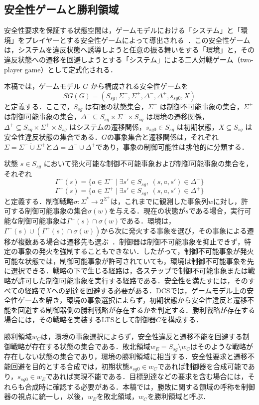 \subsection{安全性ゲームと勝利領域}
安全性要求を保証する状態空間は，ゲームモデルにおける「システム」と「環境」をプレイヤーとする安全性ゲームによって導出される~\cite{10.5555/938135}．この安全性ゲームは，システムを違反状態へ誘導しようと任意の振る舞いをする「環境」と，その違反状態への遷移を回避しようとする「システム」による二人対戦ゲーム（two-player game）として定式化される．

本稿では，ゲームモデル $G$ から構成される安全性ゲームを
\[
SG(G) = (S_{sg}, \Sigma^{-}, \Sigma^{+}, \Delta^{-}, \Delta^{+}, s_{sg0}, X)
\]
と定義する．ここで，$S_{sg}$ は有限の状態集合，$\Sigma^{-}$ は制御不可能事象の集合，$\Sigma^{+}$ は制御可能事象の集合，$\Delta^{-} \subseteq S_{sg} \times \Sigma^{-} \times S_{sg}$ は環境の遷移関係，$\Delta^{+} \subseteq S_{sg} \times \Sigma^{+} \times S_{sg}$ はシステムの遷移関係，$s_{sg0} \in S_{sg}$ は初期状態，$X \subseteq S_{sg}$ は安全性違反状態の集合である．$G$の事象集合と遷移関係は，それぞれ$\Sigma=\Sigma^{-}\mathbin{\dot\cup}\Sigma^{+}$と$\Delta=\Delta^{-}\cup\Delta^{+}$であり，事象の制御可能性は排他的に分類する．

状態 $s \in S_{sg}$ において発火可能な制御不可能事象および制御可能事象の集合を，それぞれ
\[
\Gamma^{-}(s) = \{ a \in \Sigma^{-} \mid \exists s' \in S_{sg},\ (s,a,s') \in \Delta^{-} \}
\]
\[
\Gamma^{+}(s) = \{ a \in \Sigma^{+} \mid \exists s' \in S_{sg},\ (s,a,s') \in \Delta^{+} \}
\]
と定義する．制御戦略$\sigma:\Sigma^*\to 2^{\Sigma^{+}}$は，これまでに観測した事象列$w$に対し，許可する制御可能事象の集合$\sigma(w)$を与える．現在の状態が$s$である場合，実行可能な制御可能事象は$\Gamma^{+}(s)\cap\sigma(w)$である．環境は，$\Gamma^{-}(s)\cup(\Gamma^{+}(s)\cap\sigma(w))$から次に発火する事象を選び，その事象による遷移が複数ある場合は遷移先も選ぶ~\cite{Ramadge1987,9482704}．制御器は制御不可能事象を抑止できず，特定の事象の発火を強制することもできない．したがって，制御不可能事象が発火可能な状態では，制御可能事象が許可されていても，環境は制御不可能事象を先に選択できる．戦略の下で生じる経路は，各ステップで制御不可能事象または戦略が許可した制御可能事象を実行する経路である．安全性を満たすには，そのすべての経路で$X$への到達を回避する必要がある．DCSでは，ゲームモデル上の安全性ゲームを解き，環境の事象選択によらず，初期状態から安全性違反と遷移不能を回避する制御器側の勝利戦略が存在するかを判定する．勝利戦略が存在する場合には，その戦略を実装するLTSとして制御器$C$を構成する．

勝利領域$w_C$は，環境の事象選択によらず，安全性違反と遷移不能を回避する制御戦略が存在する状態の集合である．敗北領域$w_E=S_{sg}\setminus w_C$はそのような戦略が存在しない状態の集合であり，環境の勝利領域に相当する．安全性要求と遷移不能回避を目的とする合成では，初期状態$s_{sg0}\in w_C$であれば制御器を合成可能であり，$s_{sg0}\in w_E$であれば実現不能である．目標到達などの要求を含む場合には，それらも合成時に確認する必要がある．本稿では，勝敗に関する領域の呼称を制御器の視点に統一し，以後，$w_E$を敗北領域，$w_C$を勝利領域と呼ぶ．

